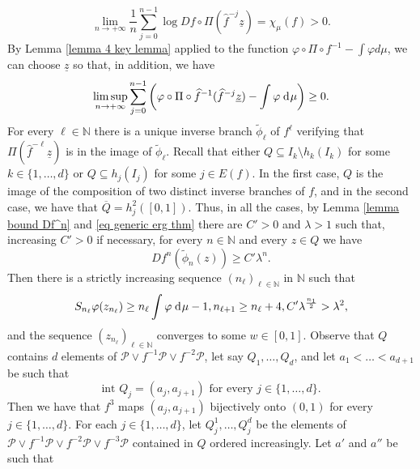 \documentclass[12pt]{amsart}
\numberwithin{equation}{section} %
\numberwithin{figure}{section} %
\theoremstyle{plain}
\theoremstyle{definition}
\theoremstyle{remark}
\theoremstyle{citing}
\newcommand{\N}{\mathbb{N}}
\renewcommand{\=}{\coloneqq}
\newcommand{\dd}{\hspace{1pt}\operatorname{d}\hspace{-1pt}}
\begin{document}
    \begin{equation}\label{eq generic erg thm}
        \lim_{n\to+\infty}\frac{1}{n}\sum_{j=0}^{n-1}\log Df\circ \Pi(\widehat{f}^{-j}\underline{z})= \chi_\mu(f) >0.
    \end{equation}
    By Lemma \ref{lemma 4 key lemma} applied to the function $\varphi\circ \Pi\circ f^{-1} - \int\varphi d\mu$, we can choose $\underline{z}$ so that, in addition, we have
    \begin{equation}
        \limsup_{n\to+\infty} \sum_{j=0}^{n-1}\left(\varphi \circ\Pi\circ\widehat{f}^{-1}(\widehat{f}^{-j}\underline{z}) - \int \varphi \dd\mu\right)\geq 0.
    \end{equation}
    For every $\ell\in \N$ there is a unique inverse branch $\widetilde{\phi}_\ell$ of $f^{\ell}$ verifying that $\Pi(\widehat{f}^{-\ell}\underline{z})$ is in the image of $\widetilde{\phi}_\ell$. Recall that either $Q\subseteq I_k\setminus h_k(I_k)$ for some $k\in\{1,\ldots,d\}$ or $Q\subseteq h_j(I_j)$ for some $j\in E(f)$. In the first case, $Q$ is the image of the composition of two distinct inverse branches of $f$, and in the second case, we have that $\overline{Q} = h_j^2([0,1])$. Thus, in all the cases, by Lemma \ref{lemma bound Df^n} and \eqref{eq generic erg thm} there are $C'>0$ and $\lambda>1$ such that, increasing $C'>0$ if necessary, for every $n\in \N$ and every $z\in Q$ we have
    \begin{equation}\label{eq key lemma expanding}
        Df^n(\widetilde{\phi}_n(z))\geq C' \lambda^n.
    \end{equation}
    Then there is a strictly increasing sequence $(n_\ell)_{\ell\in \N}$ in $\N$ such that
    \begin{equation}\label{eq n_ell}
        S_{n_\ell} \varphi(z_{n_\ell})\geq n_\ell \int \varphi \dd\mu - 1, n_{\ell+1}\geq n_{\ell}+4, C'\lambda^{\frac{n_1}{2}}>\lambda^{2},
    \end{equation}
and the sequence $(z_{n_\ell})_{\ell\in\N}$ converges to some $ w \in [0,1]$.
    Observe that $Q$ contains $d$ elements of $\mathcal{P}\vee f^{-1}\mathcal{P}\vee f^{-2}\mathcal{P}$, let say $Q_1,\ldots,Q_d$, and let $a_1<\ldots <a_{d+1}$ be such that 
    \begin{equation}
        \text{int } Q_j = (a_j,a_{j+1}) \text{ for every $j\in\{1,\ldots,d\}$}.
    \end{equation}
    Then we have that $f^3$ maps $(a_j,a_{j+1})$ bijectively onto $(0,1)$ for every $j\in\{1,\ldots,d\}$. For each $j\in\{1,\ldots,d\}$, let $Q_j^1,\ldots,Q_j^d$ be the elements of $\mathcal{P}\vee f^{-1}\mathcal{P}\vee f^{-2}\mathcal{P} \vee f^{-3}\mathcal{P}$ contained in $Q$ ordered increasingly. Let $a'$ and $a''$ be such that
\end{document}
